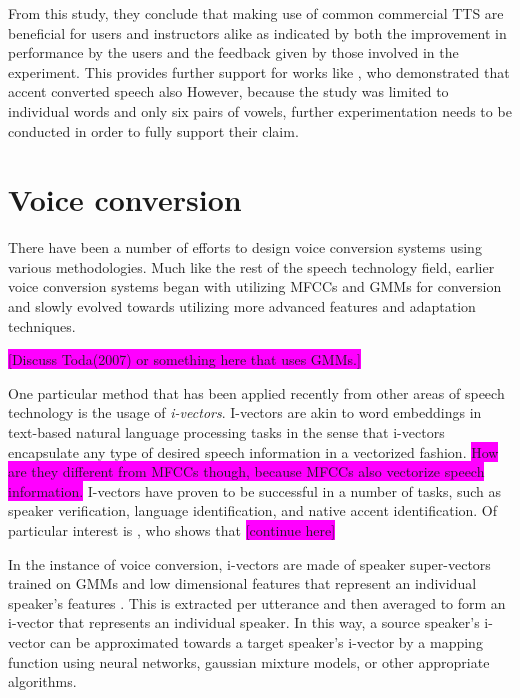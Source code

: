 \documentclass
[
    a4paper,
    twoside,
    12pt,
]
{report}
\begin{document}
From this study, they conclude that making use of common commercial TTS
are beneficial for users and instructors alike as indicated by both the
improvement in performance by the users and the feedback given by those
involved in the experiment. This provides further support for works like
\parencite{felps2009}, who demonstrated that accent converted speech
also However, because the study was limited to individual words and only
six pairs of vowels, further experimentation needs to be conducted in
order to fully support their claim.

\hypertarget{voice-conversion}{%
\section{Voice conversion}\label{voice-conversion}}

There have been a number of efforts to design voice conversion systems
using various methodologies. Much like the rest of the speech technology
field, earlier voice conversion systems began with utilizing MFCCs and
GMMs for conversion and slowly evolved towards utilizing more advanced
features and adaptation techniques.

\colorbox{magenta}{[Discuss Toda(2007) or something here that uses GMMs.]}

One particular method that has been applied recently from other areas of
speech technology is the usage of \emph{i-vectors}. I-vectors are akin
to word embeddings in text-based natural language processing tasks in
the sense that i-vectors encapsulate any type of desired speech
information in a vectorized fashion.
\colorbox{magenta}{How are they different from MFCCs though, because MFCCs also vectorize speech information.}
I-vectors have proven to be successful in a number of tasks, such as
speaker verification, language identification, and native accent
identification. Of particular interest is \textcite{demarco2013}, who
shows that \colorbox{magenta}{[continue here]}

In the instance of voice conversion, i-vectors are made of speaker
super-vectors trained on GMMs and low dimensional features that
represent an individual speaker's features \parencite{wu2016}. This is
extracted per utterance and then averaged to form an i-vector that
represents an individual speaker. In this way, a source speaker's
i-vector can be approximated towards a target speaker's i-vector by a
mapping function using neural networks, gaussian mixture models, or
other appropriate algorithms.
\end{document}
